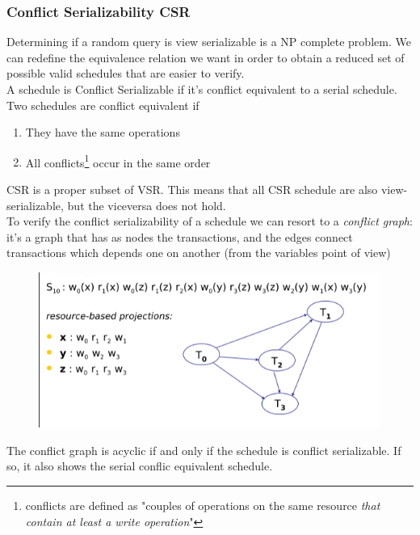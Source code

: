 \documentclass{article}
\begin{document}
				\subsubsection{Conflict Serializability CSR}
					Determining if a random query is view serializable is a NP complete problem. We can redefine the equivalence relation we want in order to obtain a reduced set of possible valid schedules that are easier to verify.\\
					A schedule is Conflict Serializable if it's conflict equivalent to a serial schedule.\\
					Two schedules are conflict equivalent if
					\begin{enumerate}
						\item They have the same operations
						\item All conflicts\footnote{conflicts are defined as "couples of operations on the same resource \textit{that contain at least a write operation}"} occur in the same order
					\end{enumerate}
					CSR is a proper subset of VSR. This means that all CSR schedule are also view-serializable, but the viceversa does not hold.\\
					To verify the conflict serializability of a schedule we can resort to a \textit{conflict graph}: it's a graph that has as nodes the transactions, and the edges connect transactions which depends one on another (from the variables point of view)
					\begin{figure}[H]
						\centering
						\includegraphics[width = \textwidth]{./images/conflictGraph.png}
					\end{figure}
					The conflict graph is acyclic if and only if the schedule is conflict serializable. If so, it also shows the serial conflic equivalent schedule. 
\end{document}
